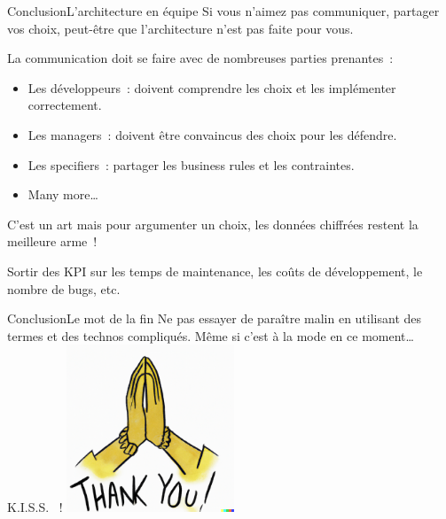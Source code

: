 \documentclass{beamer}
\begin{document}
    \begin{frame}{Conclusion}{L'architecture en équipe}
        Si vous n'aimez pas communiquer, partager vos choix, peut-être que l'architecture n'est pas faite pour vous.

        La communication doit se faire avec de nombreuses parties prenantes~:
        \begin{itemize}
            \item Les développeurs~: doivent comprendre les choix et les implémenter correctement.
            \item Les managers~: doivent être convaincus des choix pour les défendre.
            \item Les specifiers~: partager les business rules et les contraintes.
            \item Many more\ldots
        \end{itemize}
        \begin{dangercolorbox}
            C'est un art mais pour argumenter un choix, les données chiffrées restent la meilleure arme~!

            Sortir des KPI sur les temps de maintenance, les coûts de développement, le nombre de bugs, etc.
        \end{dangercolorbox}
    \end{frame}

    \begin{frame}{Conclusion}{Le mot de la fin}
        Ne pas essayer de paraître malin en utilisant des termes et des technos compliqués.
        Même si c'est à la mode en ce moment\ldots
        \bigbreak
        \centering
        K.I.S.S. ~!
        \bigbreak
        \includegraphics[width=5cm]{image/thank-you}
    \end{frame}
\end{document}
